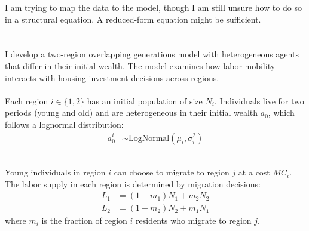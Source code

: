 \documentclass[12pt,letterpaper]{article}
\begin{document}
	I am trying to map the data to the model, though I am still unsure how to do so in a structural equation. A reduced-form equation might be sufficient.\smallskip\\

	\medskip\\
	\smallskip\\
	I develop a two-region overlapping generations model with heterogeneous agents that differ in their initial wealth. The model examines how labor mobility interacts with housing investment decisions across regions.\smallskip\\
	\smallskip\\
	Each region $i \in \{1, 2\}$ has an initial population of size $N_i$. Individuals live for two periods (young and old) and are heterogeneous in their initial wealth $a_0$, which follows a lognormal distribution:
	\begin{align*}
		a_0^i &\sim \text{LogNormal}(\mu_i, \sigma_i^2)
	\end{align*}
	
	\smallskip\\
	Young individuals in region $i$ can choose to migrate to region $j$ at a cost $MC_i$. The labor supply in each region is determined by migration decisions:
	\begin{align*}
		L_1 &= (1-m_1)N_1 + m_2N_2 \\
		L_2 &= (1-m_2)N_2 + m_1N_1
	\end{align*}
	where $m_i$ is the fraction of region $i$ residents who migrate to region $j$.
	
\end{document}
